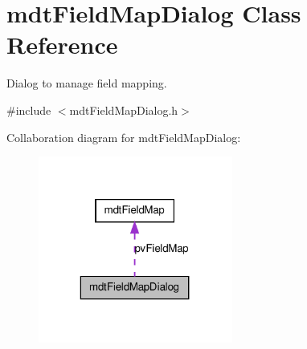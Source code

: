 \hypertarget{classmdt_field_map_dialog}{
\section{mdtFieldMapDialog Class Reference}
\label{classmdt_field_map_dialog}
}


Dialog to manage field mapping.  




{\ttfamily \#include $<$mdtFieldMapDialog.h$>$}



Collaboration diagram for mdtFieldMapDialog:\nopagebreak
\begin{figure}[H]
\begin{center}
\leavevmode
\includegraphics[width=181pt]{classmdt_field_map_dialog__coll__graph}
\end{center}
\end{figure}
